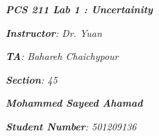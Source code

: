 

\begin{titlepage}
    \begin{center}
        \vspace*{1cm}
            
        \date{}
            
        \huge
            
        \textit{\textbf{PCS 211 Lab 1 : Uncertainity}}
            
        \vspace{0.25cm}
            
            
        \vspace{2.5cm}
            
		\vspace{0.25cm}
            
            
        \LARGE
            

		\textit{\textbf{Instructor}: Dr. Yuan}

		\textit{\textbf{TA}: Bahareh Chaichypour}

		\textit{\textbf{Section}: 45}

		\vspace{2.5cm}

		\textit{\textbf{Mohammed Sayeed Ahamad}}
            
            
        \Large         

		\vspace{6cm}

		\vspace{1cm}            
            
		\Large		
		        
		\vspace{0.25cm} 
		
		\textit{\textbf{Student Number}: 501209136}
            
        \vspace{2cm}
            
        \Large
         
		\vspace{0.25cm}                  
            
        \vspace{0.25cm}
           
            
    \end{center}
\end{titlepage}



